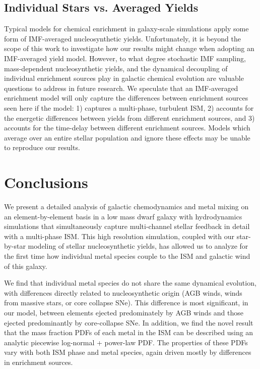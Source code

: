 \subsection{Individual Stars vs. Averaged Yields}
\label{sec:SSP yields}
Typical models for chemical enrichment in galaxy-scale simulations apply some form of IMF-averaged nucleosynthetic yields. Unfortunately, it is beyond the scope of this work to investigate how our results might change when adopting an IMF-averaged yield model. However, to what degree stochastic IMF sampling, mass-dependent nucleosynthetic yields, and the dynamical decoupling of individual enrichment sources play in galactic chemical evolution are valuable questions to address in future research. We speculate that an IMF-averaged enrichment model will only capture the differences between enrichment sources seen here if the model: 1) captures a multi-phase, turbulent ISM, 2) accounts for the energetic differences between yields from different enrichment sources, and 3) accounts for the time-delay between different enrichment sources. Models which average over an entire stellar population and ignore these effects may be unable to reproduce our results.

\section{Conclusions}
\label{sec:conclusions}
We present a detailed analysis of galactic chemodynamics and metal mixing on an element-by-element basis in a low mass dwarf galaxy with hydrodynamics simulations that simultaneously capture multi-channel stellar feedback in detail with a multi-phase ISM. This high resolution simulation, coupled with our star-by-star modeling of stellar nucleosynthetic yields, has allowed us to analyze for the first time how individual metal species couple to the ISM and galactic wind of this galaxy. 

We find that individual metal species do not share the same dynamical evolution, with differences directly related to nucleosynthetic origin (AGB winds, winds from massive stars, or core collapse SNe). This difference is most significant, in our model, between elements ejected predominately by AGB winds and those ejected predominantly by core-collapse SNe. In addition, we find the novel result that the mass fraction PDFs of each metal in the ISM can be described using an analytic piecewise log-normal + power-law PDF. The properties of these PDFs vary with both ISM phase and metal species, again driven mostly by differences in enrichment sources.


